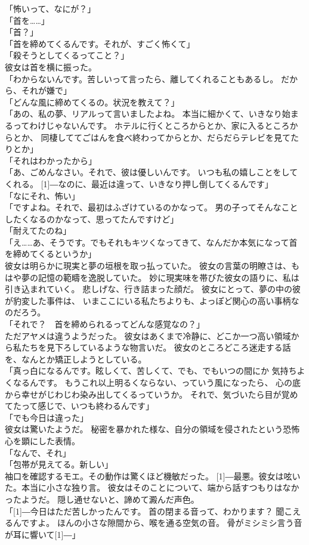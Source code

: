 \documentclass[../IHMain]{subfiles}
\begin{document}
「怖いって、なにが？」\\
「首を……」\\
「首？」\\
「首を締めてくるんです。それが、すごく怖くて」\\
「殺そうとしてくるってこと？」\\
彼女は首を横に振った。\\
「わからないんです。苦しいって言ったら、離してくれることもあるし。
だから、それが嫌で」\\
「どんな風に締めてくるの。状況を教えて？」\\
「あの、私の夢、リアルって言いましたよね。
本当に細かくて、いきなり始まるってわけじゃないんです。
ホテルに行くところからとか、家に入るところからとか、
同棲しててごはんを食べ終わってからとか、だらだらテレビを見てたりとか」\\
「それはわかったから」\\
「あ、ごめんなさい。それで、彼は優しいんです。
いつも私の嬉しことをしてくれる。
\scalebox{3}[1]{―}なのに、最近は違って、いきなり押し倒してくるんです」\\
「なにそれ、怖い」\\
「ですよね。それで、最初はふざけているのかなって。
男の子ってそんなことしたくなるのかなって、思ってたんですけど」\\
「耐えてたのね」\\
「え……あ、そうです。でもそれもキツくなってきて、なんだか本気になって首を締めてくるというか」\\
彼女は明らかに現実と夢の垣根を取っ払っていた。
彼女の言葉の明瞭さは、もはや夢の記憶の範疇を逸脱していた。
妙に現実味を帯びた彼女の語りに、私は引き込まれていく。
悲しげな、行き詰まった顔だ。
彼女にとって、夢の中の彼が豹変した事件は、
いまここにいる私たちよりも、よっぽど関心の高い事柄なのだろう。\\
「それで？　首を締められるってどんな感覚なの？」\\
ただアヤメは違うようだった。
彼女はあくまで冷静に、どこか一つ高い領域から私たちを見下ろしているような物言いだ。
彼女のところどころ迷走する話を、なんとか矯正しようとしている。\\
「真っ白になるんです。眩しくて、苦しくて、でも、でもいつの間にか
気持ちよくなるんです。
もうこれ以上明るくならない、っていう風になったら、
心の底から幸せがじわじわ染み出してくるっていうか。
それで、気づいたら目が覚めてたって感じで、いつも終わるんです」\\
「でも今日は違った」\\
彼女は驚いたようだ。
秘密を暴かれた様な、自分の領域を侵されたという恐怖心を顕にした表情。\\
「なんで、それ」\\
「包帯が見えてる。新しい」\\
袖口を確認するモエ。その動作は驚くほど機敏だった。
\scalebox{3}[1]{―}最悪。彼女は呟いた。本当に小さな独り言。
彼女はそのことについて、端から話すつもりはなかったようだ。
隠し通せないと、諦めて澱んだ声色。\\
「\scalebox{3}[1]{―}今日はただ苦しかったんです。
首の閉まる音って、わかります？
聞こえるんですよ。
ほんの小さな隙間から、喉を通る空気の音。
骨がミシミシ言う音が耳に響いて\scalebox{6}[1]{―}」\\
\end{document}
